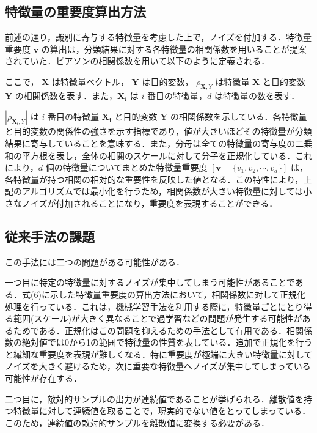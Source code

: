 \subsection{特徴量の重要度算出方法}

前述の通り，識別に寄与する特徴量を考慮した上で，ノイズを付加する．特徴量重要度 $\bm{v}$ の算出は，分類結果に対する各特徴量の相関係数を用いることが提案されていた．ピアソンの相関係数を用いて以下のように定義される．

ここで， $\bm{X}$ は特徴量ベクトル， $\bm{Y}$ は目的変数， $\rho_{\bm{X},Y}$ は特徴量 $\bm{X}$ と目的変数 $\bm{Y}$ の相関係数を表す．また，$\bm{X_i}$ は $i$ 番目の特徴量，$d$ は特徴量の数を表す．

$|\rho_{\bm{X_i},Y}|$ は $i$ 番目の特徴量 $\bm{X_i}$ と目的変数 $\bm{Y}$ の相関係数を示している．各特徴量と目的変数の関係性の強さを示す指標であり，値が大きいほどその特徴量が分類結果に寄与していることを意味する．また，分母は全ての特徴量の寄与度の二乗和の平方根を表し，全体の相関のスケールに対して分子を正規化している．これにより，$d$ 個の特徴量についてまとめた特徴量重要度 $[ \bm{v} = \{v_1, v_2, \cdots, v_d\} ]$ は，各特徴量が持つ相関の相対的な重要性を反映した値となる．この特性により，上記のアルゴリズムでは最小化を行うため，相関係数が大きい特徴量に対しては小さなノイズが付加されることになり，重要度を表現することができる．



\subsection{従来手法の課題}

この手法には二つの問題がある可能性がある．

一つ目に特定の特徴量に対するノイズが集中してしまう可能性があることである．式(6)に示した特徴量重要度の算出方法において，相関係数に対して正規化処理を行っている．これは，機械学習手法を利用する際に，特徴量ごとにとり得る範囲(スケール)が大きく異なることで過学習などの問題が発生する可能性があるためである．正規化はこの問題を抑えるための手法として有用である\cite{LawOfAwesomeDataScientist}．相関係数の絶対値では0から1の範囲で特徴量の性質を表している．追加で正規化を行うと繊細な重要度を表現が難しくなる．特に重要度が極端に大きい特徴量に対してノイズを大きく避けるため，次に重要な特徴量へノイズが集中してしまっている可能性が存在する．

二つ目に，敵対的サンプルの出力が連続値であることが挙げられる．離散値を持つ特徴量に対して連続値を取ることで，現実的でない値をとってしまっている．このため，連続値の敵対的サンプルを離散値に変換する必要がある．
